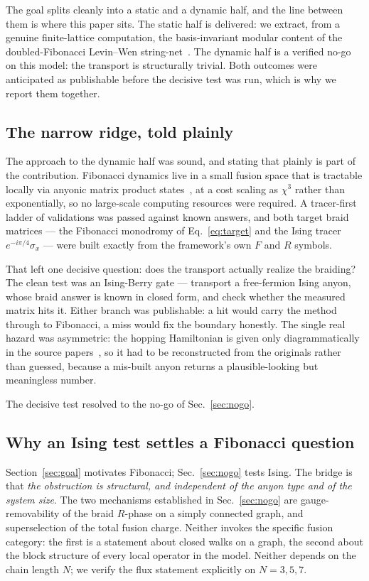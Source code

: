 \documentclass[aps,pra,twocolumn,superscriptaddress,longbibliography,floatfix,nofootinbib]{revtex4-2}
\begin{document}
The goal splits cleanly into a static and a dynamic half, and the line between
them is where this paper sits. The static half is delivered: we extract, from a
genuine finite-lattice computation, the basis-invariant modular content of the
doubled-Fibonacci Levin--Wen string-net~\cite{LevinWen2005}. The dynamic half
is a verified no-go on this model: the transport is structurally trivial. Both
outcomes were anticipated as publishable before the decisive test was run,
which is why we report them together.

\subsection{The narrow ridge, told plainly}
\label{sec:ridge}

The approach to the dynamic half was sound, and stating that plainly is part of
the contribution. Fibonacci dynamics live in a small fusion space that is
tractable locally via anyonic matrix product states~\cite{Singh2014}, at a cost
scaling as $\chi^{3}$ rather than exponentially, so no large-scale computing
resources were required. A tracer-first ladder of validations was passed
against known answers, and both target braid matrices --- the Fibonacci
monodromy of Eq.~\eqref{eq:target} and the Ising tracer
$e^{-i\pi/4}\sigma_{x}$ --- were built exactly from the framework's own $F$ and
$R$ symbols.

That left one decisive question: does the transport actually realize the
braiding? The clean test was an Ising-Berry gate --- transport a free-fermion
Ising anyon, whose braid answer is known in closed form, and check whether the
measured matrix hits it. Either branch was publishable: a hit would carry the
method through to Fibonacci, a miss would fix the boundary honestly. The single
real hazard was asymmetric: the hopping Hamiltonian is given only
diagrammatically in the source papers~\cite{Singh2014,Ayeni2016}, so it had to
be reconstructed from the originals rather than guessed, because a mis-built
anyon returns a plausible-looking but meaningless number.

The decisive test resolved to the no-go of Sec.~\ref{sec:nogo}.

\subsection{Why an Ising test settles a Fibonacci question}
\label{sec:bridge}

Section~\ref{sec:goal} motivates Fibonacci; Sec.~\ref{sec:nogo} tests Ising. The
bridge is that \emph{the obstruction is structural, and independent of the
anyon type and of the system size}. The two mechanisms established in
Sec.~\ref{sec:nogo} are gauge-removability of the braid $R$-phase on a simply
connected graph, and superselection of the total fusion charge. Neither invokes
the specific fusion category: the first is a statement about closed walks on a
graph, the second about the block structure of every local operator in the
model. Neither depends on the chain length $N$; we verify the flux statement
explicitly on $N=3,5,7$.
\end{document}
